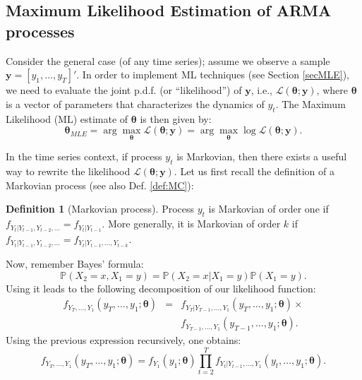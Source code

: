 \documentclass[
  12pt,
]{book}
\theoremstyle{definition}
\newtheorem{definition}{Definition}[chapter]
\theoremstyle{definition}
\theoremstyle{definition}
\theoremstyle{definition}
\theoremstyle{remark}
\begin{document}
\hypertarget{estimARMA}{%
\subsection{Maximum Likelihood Estimation of ARMA processes}\label{estimARMA}}

Consider the general case (of any time series); assume we observe a sample \(\mathbf{y}=[y_1,\dots,y_T]'\). In order to implement ML techniques (see Section \ref{secMLE}), we need to evaluate the joint p.d.f. (or ``likelihood'') of \(\mathbf{y}\), i.e., \(\mathcal{L}(\boldsymbol\theta;\mathbf{y})\), where \(\boldsymbol\theta\) is a vector of parameters that characterizes the dynamics of \(y_t\). The Maximum Likelihood (ML) estimate of \(\boldsymbol\theta\) is then given by:
\[
\boxed{\boldsymbol\theta_{MLE} = \arg \max_{\boldsymbol\theta} \mathcal{L}(\boldsymbol\theta;\mathbf{y})  = \arg \max_{\boldsymbol\theta} \log \mathcal{L}(\boldsymbol\theta;\mathbf{y}).}
\]

In the time series context, if process \(y_t\) is Markovian, then there exists a useful way to rewrite the likelihood \(\mathcal{L}(\boldsymbol\theta;\mathbf{y})\). Let us first recall the definition of a Markovian process (see also Def. \ref{def:MC}):

\begin{definition}[Markovian process]
\protect\hypertarget{def:Markov}{}\label{def:Markov}Process \(y_t\) is Markovian of order one if \(f_{Y_t|Y_{t-1},Y_{t-2},\dots} = f_{Y_t|Y_{t-1}}\). More generally, it is Markovian of order \(k\) if \(f_{Y_t|Y_{t-1},Y_{t-2},\dots} = f_{Y_t|Y_{t-1},\dots,Y_{t-k}}\).
\end{definition}

Now, remember Bayes' formula:
\[
\mathbb{P}(X_2=x,X_1=y) = \mathbb{P}(X_2=x|X_1=y)\mathbb{P}(X_1=y).
\]
Using it leads to the following decomposition of our likelihood function:
\begin{eqnarray*}
f_{Y_T,\dots,Y_1}(y_T,\dots,y_1;\boldsymbol\theta) &=&f_{Y_T|Y_{T-1},\dots,Y_1}(y_T,\dots,y_1;\boldsymbol\theta) \times \\
&& f_{Y_{T-1},\dots,Y_1}(y_{T-1},\dots,y_1;\boldsymbol\theta).
\end{eqnarray*}
Using the previous expression recursively, one obtains:
\begin{equation}
f_{Y_T,\dots,Y_1}(y_T,\dots,y_1;\boldsymbol\theta) = f_{Y_1}(y_1;\boldsymbol\theta) \prod_{t=2}^{T} f_{Y_t|Y_{t-1},\dots,Y_1}(y_t,\dots,y_1;\boldsymbol\theta).\label{eq:recursMLE}
\end{equation}
\end{document}
